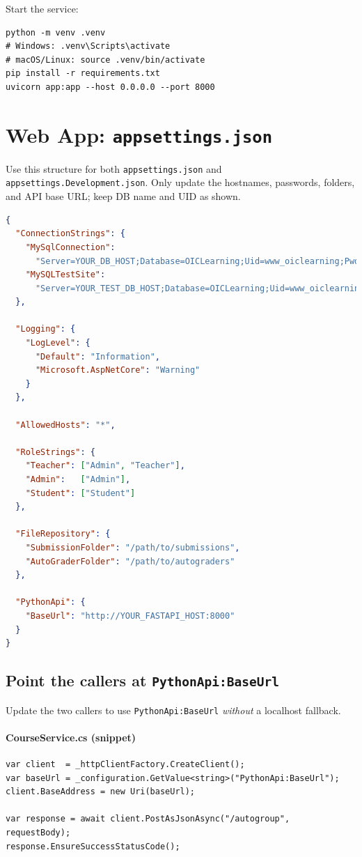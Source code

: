 \documentclass[ms,twoside,print]{nuthesis}
\begin{document}
\noindent Start the service:
\begin{lstlisting}
python -m venv .venv
# Windows: .venv\Scripts\activate
# macOS/Linux: source .venv/bin/activate
pip install -r requirements.txt
uvicorn app:app --host 0.0.0.0 --port 8000
\end{lstlisting}

\section{Web App: \texttt{appsettings.json}}
Use this structure for both \texttt{appsettings.json} and \texttt{appsettings.Development.json}.
Only update the hostnames, passwords, folders, and API base URL; keep DB name and UID as shown.

\begin{lstlisting}[language=json]
{
  "ConnectionStrings": {
    "MySqlConnection":
      "Server=YOUR_DB_HOST;Database=OICLearning;Uid=www_oiclearning;Pwd=YOUR_DB_PASSWORD",
    "MySQLTestSite":
      "Server=YOUR_TEST_DB_HOST;Database=OICLearning;Uid=www_oiclearning;Pwd=YOUR_TEST_DB_PASSWORD"
  },

  "Logging": {
    "LogLevel": {
      "Default": "Information",
      "Microsoft.AspNetCore": "Warning"
    }
  },

  "AllowedHosts": "*",

  "RoleStrings": {
    "Teacher": ["Admin", "Teacher"],
    "Admin":   ["Admin"],
    "Student": ["Student"]
  },

  "FileRepository": {
    "SubmissionFolder": "/path/to/submissions",
    "AutoGraderFolder": "/path/to/autograders"
  },

  "PythonApi": {
    "BaseUrl": "http://YOUR_FASTAPI_HOST:8000"
  }
}
\end{lstlisting}

\subsection*{Point the callers at \texttt{PythonApi:BaseUrl}}
Update the two callers to use \texttt{PythonApi:BaseUrl} \emph{without} a localhost fallback.

\paragraph{CourseService.cs (snippet)}
\begin{lstlisting}[language={[Sharp]C}]
var client  = _httpClientFactory.CreateClient();
var baseUrl = _configuration.GetValue<string>("PythonApi:BaseUrl");
client.BaseAddress = new Uri(baseUrl);

var response = await client.PostAsJsonAsync("/autogroup", requestBody);
response.EnsureSuccessStatusCode();
\end{lstlisting}
\end{document}
